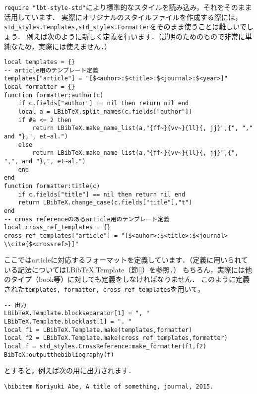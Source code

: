 \documentclass[a4paper]{ltjsarticle}
\begin{document}
\verb|require "lbt-style-std"|により標準的なスタイルを読み込み，それをそのまま活用しています．
実際にオリジナルのスタイルファイルを作成する際には，\verb|std_styles.Templates,std_styles.Formatter|をそのまま使うことは難しいでしょう．
例えば次のように新しく定義を行います．（説明のためのもので非常に単純なため，実際には使えません．）
\begin{lstlisting}
local templates = {}
-- article用のテンプレート定義
templates["article"] = "[$<auhor>:$<title>:$<journal>:$<year>]"
local formatter = {}
function formatter:author(c)
	if c.fields["author"] == nil then return nil end
	local a = LBibTeX.split_names(c.fields["author"])
	if #a <= 2 then
		return LBibTeX.make_name_list(a,"{ff~}{vv~}{ll}{, jj}",{", "," and "},", et~al.")
	else
		return LBibTeX.make_name_list(a,"{ff~}{vv~}{ll}{, jj}",{", ",", and "},", et~al.")
	end
end
function formatter:title(c)
	if c.fields["title"] == nil then return nil end
	return LBibTeX.change_case(c.fields["title"],"t")
end
-- cross referenceのあるarticle用のテンプレート定義
local cross_ref_templates = {}
cross_ref_templates["article"] = "[$<auhor>:$<title>:$<journal> \\cite{$<crossref>}]"
\end{lstlisting}
ここではarticleに対応するフォーマットを定義しています．（定義に用いられている記法についてはLBibTeX.Template（節\ref{}）を参照．）
もちろん，実際には他のタイプ（book等）に対しても定義をしなければなりません．
このように定義された\verb|templates, formatter, cross_ref_templates|を用いて，
\begin{lstlisting}
-- 出力
LBibTeX.Template.blockseparator[1] = ", "
LBibTeX.Template.blocklast[1] = ". "
local f1 = LBibTeX.Template.make(templates,formatter)
local f2 = LBibTeX.Template.make(cross_ref_templates,formatter)
local f = std_styles.CrossReference:make_formatter(f1,f2)
BibTeX:outputthebibliography(f)
\end{lstlisting}
とすると，例えば次の用に出力されます．
\begin{lstlisting}[language={[latex]TeX}]
\bibitem Noriyuki Abe, A title of something, journal, 2015.
\end{lstlisting}
\end{document}
